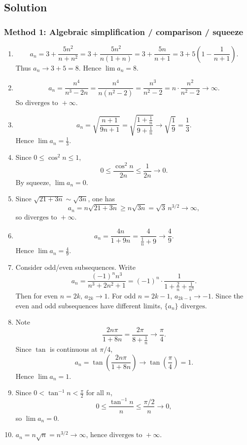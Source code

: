 \documentclass[12pt]{article}
\begin{document}
\subsection*{Solution}

\subsubsection*{Method 1: Algebraic simplification / comparison / squeeze}

\begin{enumerate}[label=(\roman*)]
\item
\[
a_n=3+\frac{5n^{2}}{n+n^{2}}=3+\frac{5n^{2}}{n(1+n)}=3+\frac{5n}{n+1}
=3+5\left(1-\frac{1}{n+1}\right).
\]
Thus \(a_n\to 3+5=8\). Hence \(\boxed{\lim a_n=8}\).

\item
\[
a_n=\frac{n^{4}}{n^{3}-2n}=\frac{n^{4}}{n(n^{2}-2)}=\frac{n^{3}}{n^{2}-2}
=n\cdot \frac{n^{2}}{n^{2}-2}\to \infty.
\]
So \(\boxed{\text{diverges to }+\infty}\).

\item
\[
a_n=\sqrt{\frac{n+1}{9n+1}}
=\sqrt{\frac{1+\frac{1}{n}}{9+\frac{1}{n}}}\to \sqrt{\frac{1}{9}}=\frac{1}{3}.
\]
Hence \(\boxed{\lim a_n=\frac{1}{3}}\).

\item Since \(0\le \cos^{2}n\le 1\),
\[
0\le \frac{\cos^{2}n}{2n}\le \frac{1}{2n}\to 0.
\]
By squeeze, \(\boxed{\lim a_n=0}\).

\item Since \(\sqrt{21+3n}\sim \sqrt{3n}\), one has
\[
a_n=n\sqrt{21+3n}\ge n\sqrt{3n}= \sqrt{3}\,n^{3/2}\to \infty,
\]
so \(\boxed{\text{diverges to }+\infty}\).

\item
\[
a_n=\frac{4n}{1+9n}=\frac{4}{\frac{1}{n}+9}\to \frac{4}{9}.
\]
Hence \(\boxed{\lim a_n=\frac{4}{9}}\).

\item Consider odd/even subsequences. Write
\[
a_n=\frac{(-1)^{n}n^{3}}{n^{3}+2n^{2}+1}
=(-1)^{n}\cdot \frac{1}{1+\frac{2}{n}+\frac{1}{n^{3}}}.
\]
Then for even \(n=2k\), \(a_{2k}\to 1\). For odd \(n=2k-1\), \(a_{2k-1}\to -1\). Since the even and odd subsequences have different limits, \(\boxed{\{a_n\}\text{ diverges}}\).

\item Note
\[
\frac{2n\pi}{1+8n}=\frac{2\pi}{8+\frac{1}{n}}\to \frac{\pi}{4}.
\]
Since \(\tan\) is continuous at \(\pi/4\),
\[
a_n=\tan\!\left(\frac{2n\pi}{1+8n}\right)\to \tan\left(\frac{\pi}{4}\right)=1.
\]
Hence \(\boxed{\lim a_n=1}\).

\item Since \(0<\tan^{-1}n<\frac{\pi}{2}\) for all \(n\),
\[
0\le \frac{\tan^{-1}n}{n}\le \frac{\pi/2}{n}\to 0,
\]
so \(\boxed{\lim a_n=0}\).

\item \(a_n=n\sqrt{n}=n^{3/2}\to \infty\), hence \(\boxed{\text{diverges to }+\infty}\).
\end{enumerate}
\end{document}
